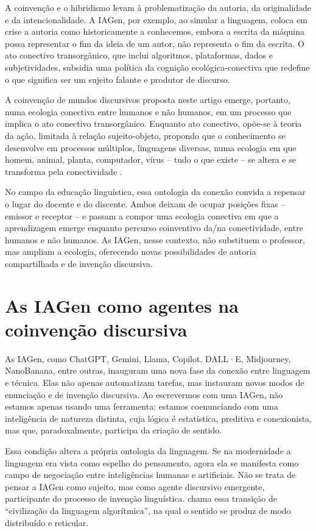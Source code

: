\documentclass[portuguese]{textolivre}
\begin{document}
A coinvenção e o hibridismo levam à problematização da autoria, da originalidade e da intencionalidade. A IAGen, por exemplo, ao simular a linguagem, coloca em crise a autoria como historicamente a conhecemos, embora a escrita da máquina possa representar o fim da ideia de um autor, não representa o fim da escrita. O ato conectivo transorgânico, que inclui algoritmos, plataformas, dados e subjetividades, subsidia uma política da cognição ecológica-conectiva \cite{schlemmer2023protagonismo} que redefine o que significa ser um sujeito falante e produtor de discurso.

A coinvenção de mundos discursivos proposta neste artigo emerge, portanto, numa ecologia conectiva entre humanos e não humanos, em um processo que implica o ato conectivo transorgânico. Enquanto ato conectivo, opõe-se à teoria da ação, limitada à relação sujeito-objeto, propondo que o conhecimento se desenvolve em processos múltiplos, linguagens diversas, numa ecologia em que homem, animal, planta, computador, vírus – tudo o que existe – se altera e se transforma pela conectividade \cite{difelice2017netativismo}.

No campo da educação linguística, essa ontologia da conexão convida a repensar o lugar do docente e do discente. Ambos deixam de ocupar posições fixas – emissor e receptor – e passam a compor uma ecologia conectiva em que a aprendizagem emerge enquanto percurso coinventivo da/na conectividade, entre humanos e não humanos. As IAGen, nesse contexto, não substituem o professor, mas ampliam a ecologia, oferecendo novas possibilidades de autoria compartilhada e de invenção discursiva.

\section{As IAGen como agentes na coinvenção discursiva}\label{sec-5}
As IAGen, como ChatGPT, Gemini, Llama, Copilot, DALL·E, Midjourney, NanoBanana, entre outras, inauguram uma nova fase da conexão entre linguagem e técnica. Elas não apenas automatizam tarefas, mas instauram novos modos de enunciação e de invenção discursiva. Ao escrevermos com uma IAGen, não estamos apenas usando uma ferramenta: estamos coenunciando com uma inteligência de natureza distinta, cuja lógica é estatística, preditiva e conexionista, mas que, paradoxalmente, participa da criação de sentido.

Essa condição altera a própria ontologia da linguagem. Se na modernidade a linguagem era vista como espelho do pensamento, agora ela se manifesta como campo de negociação entre inteligências humanas e artificiais. Não se trata de pensar a IAGen como sujeito, mas como agente discursivo emergente, participante do processo de invenção linguística. \textcite{accoto2020mundodado} chama essa transição de “civilização da linguagem algorítmica”, na qual o sentido se produz de modo distribuído e reticular.
\end{document}
